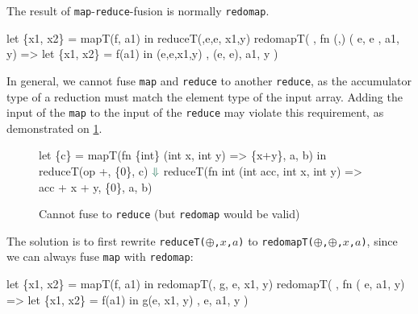 The result of \texttt{map}-\texttt{reduce}-fusion is normally
\texttt{redomap}.

\begin{colorcode}
let \{x1, x2\} = mapT(f, a1)
in  reduceT(\mymath{\oplus},e,e, x1,y)
    \emphh{\mymath{\Downarrow}}
redomapT(\mymath{\oplus}
, fn (,) (  e,  e
             ,  a1, y)
   => let \{x1, x2\} = f(a1)
      in  \mymath{\oplus}(e,e,x1,y)
, (e, e), a1, y )
\end{colorcode}

In general, we cannot fuse \texttt{map} and \texttt{reduce} to another
\texttt{reduce}, as the accumulator type of a reduction must match the
element type of the input array. Adding the input of the \texttt{map}
to the input of the \texttt{reduce} may violate this requirement, as
demonstrated on \cref{fig:map-reduce-error}.

\begin{figure}
\begin{center}
\begin{colorcode}
let \{c\} = mapT(fn \{int\} (int x, int y) => \{x+y\},
                 a, b) in
reduceT(op +, \{0\}, c)
  \(\emphh{\Downarrow}\)
reduceT(fn int (int acc, int x, int y) => acc + x + y,
        \{0\}, a, b) 
\end{colorcode}
\end{center}

\caption{Cannot fuse to \texttt{reduce} (but \texttt{redomap} would be valid)}
\label{fig:map-reduce-error}
\end{figure}

The solution is to first rewrite \texttt{reduceT($\oplus$,$x$,$a$)} to
\texttt{redomapT($\oplus$,$\oplus$,$x$,$a$)}, since we can always fuse
\texttt{map} with \texttt{redomap}:

\begin{colorcode}
let \{x1, x2\} = mapT(f, a1)
in  redomapT(\mymath{\oplus}, g, e, x1, y)
    \emphh{\mymath{\Downarrow}}
redomapT(\mymath{\oplus}
, fn \mymath{\beta} (\mymath{\beta} e,  a1,  y)
   => let \{x1, x2\} = f(a1)
      in  g(e, x1, y)
, e, a1, y )
\end{colorcode}

